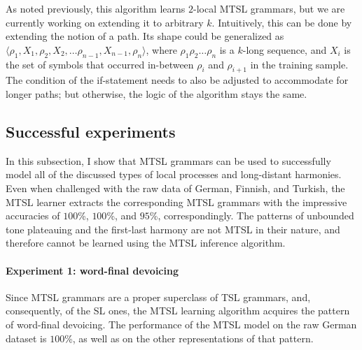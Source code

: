 As noted previously, this algorithm learns $2$-local MTSL grammars, but we are currently working on extending it to arbitrary $k$.
Intuitively, this can be done by extending the notion of a path.
Its shape could be generalized as $\langle\rho_1, X_1, \rho_2, X_2, \dots \rho_{n-1}, X_{n-1}, \rho_n\rangle$, where $\rho_1\rho_2\dots\rho_n$ is a $k$-long sequence, and $X_i$ is the set of symbols that occurred in-between $\rho_i$ and $\rho_{i+1}$ in the training sample.
The condition of the if-statement needs to also be adjusted to accommodate for longer paths; but otherwise, the logic of the algorithm stays the same.



\subsection{Successful experiments}

In this subsection, I show that MTSL grammars can be used to successfully model all of the discussed types of local processes and long-distant harmonies.
Even when challenged with the raw data of German, Finnish, and Turkish, the MTSL learner extracts the corresponding MTSL grammars with the impressive accuracies of $100$\%, $100$\%, and $95$\%, correspondingly.
The patterns of unbounded tone plateauing and the first-last harmony are not MTSL in their nature, and therefore cannot be learned using the MTSL inference algorithm.


\paragraph{Experiment 1: word-final devoicing}

Since MTSL grammars are a proper superclass of TSL grammars, and, consequently, of the SL ones, the MTSL learning algorithm acquires the pattern of word-final devoicing.
The performance of the MTSL model on the raw German dataset is $100$\%, as well as on the other representations of that pattern.

\begin{table}[h!]
\centering
{}
\caption{MTSL learning of the word-final devoicing; raw representation.}
\end{table}


